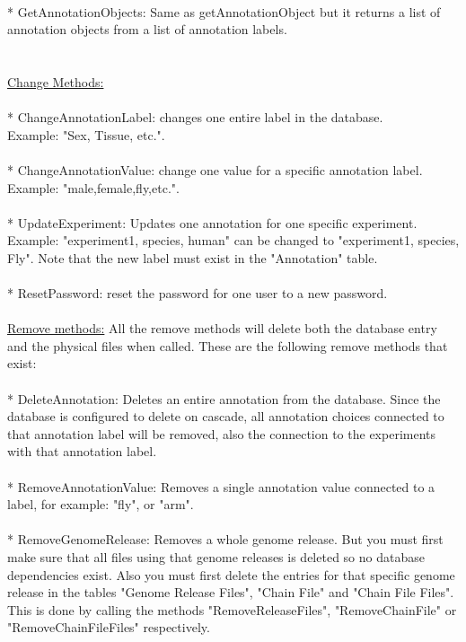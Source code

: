\\
* GetAnnotationObjects: Same as getAnnotationObject but it returns a list of annotation objects from a list of annotation labels.\\
\\
\\
\underline{Change Methods:}\\
\\
* ChangeAnnotationLabel: changes one entire label in the database.\\Example: "Sex, Tissue, etc.".\\
\\
* ChangeAnnotationValue: change one value for a specific annotation label.\\Example: "male,female,fly,etc.".\\
\\
* UpdateExperiment: Updates one annotation for one specific experiment. Example: "experiment1, species, human" can be changed to "experiment1, species, Fly". Note that the new label must exist in the "Annotation" table.\\
\\
* ResetPassword: reset the password for one user to a new password. \\
\\
\underline{Remove methods:} All the remove methods will delete both the database entry and the physical files when called. These are the following remove methods that exist:\\
\\
* DeleteAnnotation: Deletes an entire annotation from the database. Since the database is configured to delete on cascade, all annotation choices connected to that annotation label will be removed, also the connection to the experiments with that annotation label.\\
\\
* RemoveAnnotationValue: Removes a single annotation value connected to a label, for example: "fly", or "arm".\\
\\
* RemoveGenomeRelease: Removes a whole genome release. But you must first make sure that all files using that genome releases is deleted so no database dependencies exist. Also you must first delete the entries for that specific genome release in the tables "Genome Release Files", "Chain File" and "Chain File Files". This is done by calling the methods "RemoveReleaseFiles", "RemoveChainFile" or "RemoveChainFileFiles" respectively. \\
